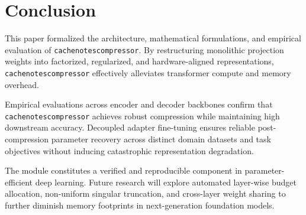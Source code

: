 \section{Conclusion}
This paper formalized the architecture, mathematical formulations, and empirical evaluation of \texttt{cachenotescompressor}. By restructuring monolithic projection weights into factorized, regularized, and hardware-aligned representations, \texttt{cachenotescompressor} effectively alleviates transformer compute and memory overhead.

Empirical evaluations across encoder and decoder backbones confirm that \texttt{cachenotescompressor} achieves robust compression while maintaining high downstream accuracy. Decoupled adapter fine-tuning ensures reliable post-compression parameter recovery across distinct domain datasets and task objectives without inducing catastrophic representation degradation.

The module constitutes a verified and reproducible component in parameter-efficient deep learning. Future research will explore automated layer-wise budget allocation, non-uniform singular truncation, and cross-layer weight sharing to further diminish memory footprints in next-generation foundation models.
